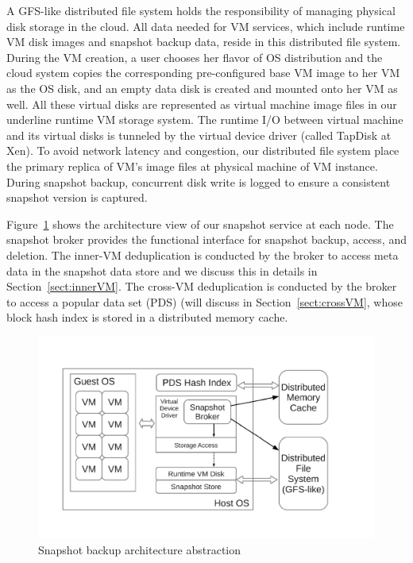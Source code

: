 A GFS-like distributed file system holds the responsibility of managing physical disk storage
in the cloud. All data needed for VM services, which include runtime VM disk images and snapshot backup data,
reside in this distributed file system.
During the VM creation, a user chooses her flavor of OS distribution and the cloud system 
copies the corresponding pre-configured base VM image to her VM as the OS disk, 
and an empty data disk is created and mounted onto her VM as well. 
All these virtual disks are represented as virtual machine image files in our
underline runtime VM storage system. The runtime I/O between virtual machine and its virtual
disks is tunneled by the virtual device driver (called TapDisk\cite{Warfield2005} at Xen). To avoid network latency and congestion, 
our distributed file system place the primary replica of VM's 
image files at physical machine of VM instance.
During snapshot backup, concurrent disk write is logged 
to ensure a consistent snapshot version is captured. 

Figure~\ref{fig:arch} shows the architecture view of our snapshot service
at each node. The snapshot broker provides the functional interface for snapshot backup, access, and deletion.
The inner-VM  deduplication is conducted by the broker to access meta data in the snapshot data store
and we discuss this in details in Section~\ref{sect:innerVM}.
The cross-VM deduplication is conducted by the broker to access 
a popular data set (PDS) (will discuss in Section~\ref{sect:crossVM},
whose block hash index is stored in a distributed memory cache. 

\begin{figure}[htbp]
  \centering
  \includegraphics[width=5in]{images/arch1.pdf}
  \caption{Snapshot backup architecture abstraction}
  \label{fig:arch}
\end{figure}

